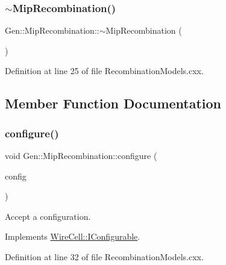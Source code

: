 \subsubsection{\texorpdfstring{$\sim$\+Mip\+Recombination()}{~MipRecombination()}}
{\footnotesize\ttfamily Gen\+::\+Mip\+Recombination\+::$\sim$\+Mip\+Recombination (\begin{DoxyParamCaption}{ }\end{DoxyParamCaption})\hspace{0.3cm}{\ttfamily [virtual]}}



Definition at line 25 of file Recombination\+Models.\+cxx.



\subsection{Member Function Documentation}
\mbox{\label{class_wire_cell_1_1_gen_1_1_mip_recombination_a5fed946c2d21dfd6dcb1df1864eec0a1}} 
\subsubsection{\texorpdfstring{configure()}{configure()}}
{\footnotesize\ttfamily void Gen\+::\+Mip\+Recombination\+::configure (\begin{DoxyParamCaption}\item[{const \hyperlink{namespace_wire_cell_a9f705541fc1d46c608b3d32c182333ee}{Wire\+Cell\+::\+Configuration} \&}]{config }\end{DoxyParamCaption})\hspace{0.3cm}{\ttfamily [virtual]}}



Accept a configuration. 



Implements \hyperlink{class_wire_cell_1_1_i_configurable_a57ff687923a724093df3de59c6ff237d}{Wire\+Cell\+::\+I\+Configurable}.



Definition at line 32 of file Recombination\+Models.\+cxx.

\mbox{\label{class_wire_cell_1_1_gen_1_1_mip_recombination_aeef16da2540f00fb156d5d7506d27449}} 

